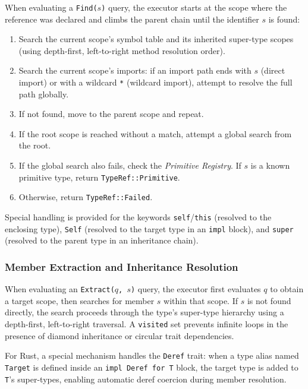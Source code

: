 When evaluating a \texttt{Find($s$)} query, the executor starts at the scope where the reference was declared and climbs the parent chain until the identifier $s$ is found:

\begin{enumerate}
  \item Search the current scope's symbol table and its inherited super-type scopes (using depth-first, left-to-right method resolution order).
  \item Search the current scope's imports: if an import path ends with $s$ (direct import) or with a wildcard \texttt{*} (wildcard import), attempt to resolve the full path globally.
  \item If not found, move to the parent scope and repeat.
  \item If the root scope is reached without a match, attempt a global search from the root.
  \item If the global search also fails, check the \textit{Primitive Registry}. If $s$ is a known primitive type, return \texttt{TypeRef::Primitive}.
  \item Otherwise, return \texttt{TypeRef::Failed}.
\end{enumerate}

Special handling is provided for the keywords \texttt{self}/\texttt{this} (resolved to the enclosing type), \texttt{Self} (resolved to the target type in an \texttt{impl} block), and \texttt{super} (resolved to the parent type in an inheritance chain).

\subsubsection{Member Extraction and Inheritance Resolution}

When evaluating an \texttt{Extract($q$, $s$)} query, the executor first evaluates $q$ to obtain a target scope, then searches for member $s$ within that scope. If $s$ is not found directly, the search proceeds through the type's super-type hierarchy using a depth-first, left-to-right traversal. A \texttt{visited} set prevents infinite loops in the presence of diamond inheritance or circular trait dependencies.

For Rust, a special mechanism handles the \texttt{Deref} trait: when a type alias named \texttt{Target} is defined inside an \texttt{impl Deref for T} block, the target type is added to \texttt{T}'s super-types, enabling automatic deref coercion during member resolution.

